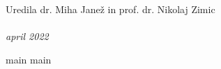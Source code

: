 \documentclass[graybox, envcountchap]{svmult}
\begin{document}
\large Uredila dr. Miha Janež in prof. dr. Nikolaj Zimic\\
\\
\normalsize \emph{april 2022}






\tableofcontents




{main}
{main}

%





\backmatter





\end{document}
